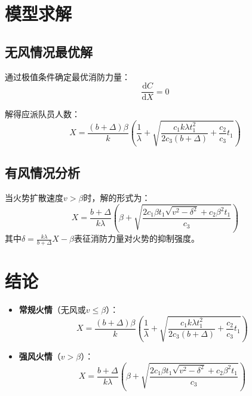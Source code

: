 \section{模型求解}
\subsection*{无风情况最优解}
通过极值条件确定最优消防力量：
\begin{equation}\label{eq:windless_optimal}
    \frac{\mathrm{d}C}{\mathrm{d}X} = 0
\end{equation}

解得应派队员人数：
\begin{equation}\label{eq:windless_solution}
    X = \frac{(b + \Delta)\beta}{k} \left( \frac{1}{\lambda} + \sqrt{\frac{c_1 k \lambda t_1^2}{2c_3 (b + \Delta)} + \frac{c_2}{c_3}t_1} \right)
\end{equation}

\subsection*{有风情况分析}
当火势扩散速度$v > \beta$时，解的形式为：
\begin{equation}\label{eq:wind_solution}
    X = \frac{b + \Delta}{k\lambda}\left(\beta + \sqrt{\frac{2c_1\beta t_1\sqrt{v^2 - \delta^2} + c_2\beta^2t_1}{c_3}} \right)
\end{equation}
其中$\delta = \frac{k\lambda}{b+\Delta}X - \beta$表征消防力量对火势的抑制强度。

\section{结论}
\begin{itemize}
    \item \textbf{常规火情}（无风或$v \leq \beta$）：
    \begin{equation}\label{eq:general_solution}
        X = \frac{(b+\Delta)\beta}{k}\left(\frac{1}{\lambda} + \sqrt{\frac{c_1k\lambda t_1^2}{2c_3(b + \Delta)} + \frac{c_2}{c_3}t_1}\right)
    \end{equation}

    \item \textbf{强风火情}（$v > \beta$）：
    \begin{equation}\label{eq:strong_wind_solution}
        X = \frac{b+\Delta}{k\lambda}\left(\beta + \sqrt{\frac{2c_1\beta t_1\sqrt{v^2 - \delta^2} + c_2\beta^2t_1}{c_3}}\right)
    \end{equation}
\end{itemize}
